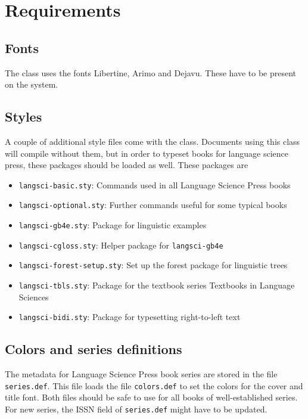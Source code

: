 \documentclass[%
modfonts,
output=guidelines,
guidelines]{langscibook}
\begin{document}
\chapter{Requirements}
\section{Fonts}
The class uses the fonts Libertine, Arimo and Dejavu. These have to be present on the system. 

\section{Styles}
A couple of additional style files come with the class. Documents using this class will compile without them, but in order to typeset books for language science press, these packages should be loaded as well. These packages are

\begin{itemize}
 \item \texttt{langsci-basic.sty}: Commands used in all Language Science Press books
 \item \texttt{langsci-optional.sty}: Further commands useful for some typical books
 \item \texttt{langsci-gb4e.sty}: Package for linguistic examples
 \item \texttt{langsci-cgloss.sty}: Helper package for \texttt{langsci-gb4e}
 \item \texttt{langsci-forest-setup.sty}: Set up the forest package for linguistic trees
 \item \texttt{langsci-tbls.sty}: Package for the textbook series Textbooks in Language Sciences
 \item \texttt{langsci-bidi.sty}: Package for typesetting right-to-left text
\end{itemize}

\section{Colors and series definitions}
The metadata for Language Science Press book series are stored in the file \texttt{series.def}. This file loads the file \texttt{colors.def} to set the colors for the cover and title font. Both files should be safe to use for all books of well-established series. For new series, the ISSN field of \texttt{series.def} might have to be updated. 
\end{document}
